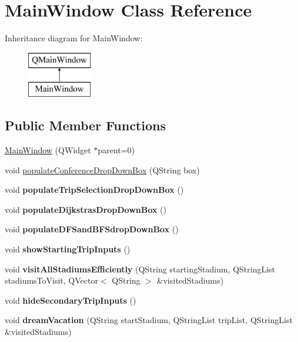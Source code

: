 \hypertarget{class_main_window}{}\section{Main\+Window Class Reference}
\label{class_main_window}
Inheritance diagram for Main\+Window\+:\begin{figure}[H]
\begin{center}
\leavevmode
\includegraphics[height=2.000000cm]{class_main_window}
\end{center}
\end{figure}
\subsection*{Public Member Functions}
\begin{DoxyCompactItemize}
\item 
\hyperlink{class_main_window_a8b244be8b7b7db1b08de2a2acb9409db}{Main\+Window} (Q\+Widget $\ast$parent=0)
\item 
void \hyperlink{class_main_window_adc0662d3cc64fcb561bfd6ac8b09726c}{populate\+Conference\+Drop\+Down\+Box} (Q\+String box)
\item 
\mbox{\label{class_main_window_a281137be7e79828fe96c4959c8b9ebe6}} 
void {\bfseries populate\+Trip\+Selection\+Drop\+Down\+Box} ()
\item 
\mbox{\label{class_main_window_a54af06c29e75a4fe491e006a20d9d90b}} 
void {\bfseries populate\+Dijkstras\+Drop\+Down\+Box} ()
\item 
\mbox{\label{class_main_window_a355c912d60d63c0c076658def96e6201}} 
void {\bfseries populate\+D\+F\+Sand\+B\+F\+Sdrop\+Down\+Box} ()
\item 
\mbox{\label{class_main_window_a505a2178bd2176455f98b784b328d3bf}} 
void {\bfseries show\+Starting\+Trip\+Inputs} ()
\item 
\mbox{\label{class_main_window_accf97cf25e538c019e1fe48910e35c95}} 
void {\bfseries visit\+All\+Stadiums\+Efficiently} (Q\+String starting\+Stadium, Q\+String\+List stadiums\+To\+Visit, Q\+Vector$<$ Q\+String $>$ \&visited\+Stadiums)
\item 
\mbox{\label{class_main_window_a72dc5e4404b2966dc03a3694a9cdfd21}} 
void {\bfseries hide\+Secondary\+Trip\+Inputs} ()
\item 
\mbox{\label{class_main_window_a77dac0add3c158454ce4b8b6e8579008}} 
void {\bfseries dream\+Vacation} (Q\+String start\+Stadium, Q\+String\+List trip\+List, Q\+String\+List \&visited\+Stadiums)
\end{DoxyCompactItemize}
